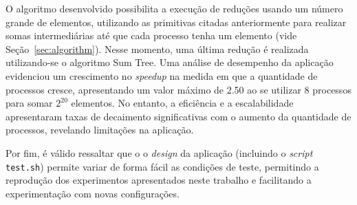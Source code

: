 \documentclass[12pt,a4paper]{article}
\begin{document}
O algoritmo desenvolvido possibilita a execução de reduções usando um número
grande de elementos, utilizando as primitivas citadas anteriormente para
realizar somas intermediárias até que cada processo tenha um elemento (vide
Seção~\ref{sec:algorithm}). Nesse momento, uma última redução é realizada
utilizando-se o algoritmo Sum Tree. Uma análise de desempenho da aplicação
evidenciou um crescimento no \textit{speedup} na medida em que a quantidade de
processos cresce, apresentando um valor máximo de 2.50 ao se utilizar 8
processos para somar $2^{20}$ elementos. No entanto, a eficiência e a
escalabilidade apresentaram taxas de decaimento significativas com o aumento da
quantidade de processos, revelando limitações na aplicação.

Por fim, é válido ressaltar que o o \textit{design} da aplicação (incluindo o
\textit{script} \texttt{test.sh}) permite variar de forma fácil as condições de
teste, permitindo a reprodução dos experimentos apresentados neste trabalho e
facilitando a experimentação com novas configurações. 






\end{document}
